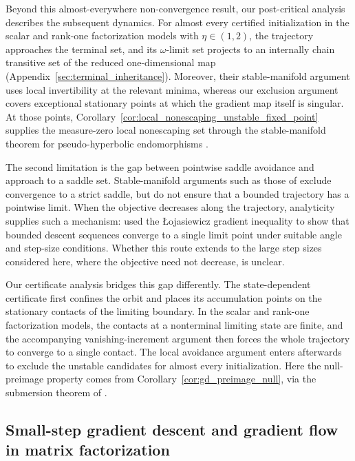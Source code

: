 \documentclass{article}
\begin{document}
Beyond this almost-everywhere non-convergence result, our post-critical
analysis describes the subsequent dynamics. For almost every certified
initialization in the scalar and rank-one factorization models with
$\eta\in(1,2)$, the trajectory approaches the terminal set, and its
$\omega$-limit set projects to an internally chain transitive set of the reduced
one-dimensional map (Appendix~\ref{sec:terminal_inheritance}). Moreover, their
stable-manifold argument uses local invertibility at the relevant minima,
whereas our exclusion argument covers exceptional stationary points at which
the gradient map itself is singular. At those points,
Corollary~\ref{cor:local_nonescaping_unstable_fixed_point} supplies the
measure-zero local nonescaping set through the stable-manifold theorem for
pseudo-hyperbolic endomorphisms \citep[Theorem~5.1]{hirsch1977invariant}.

The second limitation is the gap between pointwise saddle avoidance and
approach to a saddle set. Stable-manifold arguments such as those of
\citet{panageas2017gradient} exclude convergence to a strict saddle, but do not
ensure that a bounded trajectory has a pointwise limit. When the objective
decreases along the trajectory, analyticity supplies such a mechanism:
\citet{absil2005convergence} used the {\L}ojasiewicz gradient inequality to show
that bounded descent sequences converge to a single limit point under suitable
angle and step-size conditions. Whether this route extends to the large step
sizes considered here, where the objective need not decrease, is unclear.

Our certificate analysis bridges this gap differently. The state-dependent
certificate first confines the orbit and places its accumulation points on the
stationary contacts of the limiting boundary. In the scalar and rank-one
factorization models, the contacts at a nonterminal limiting state are finite,
and the accompanying vanishing-increment argument then forces the whole
trajectory to converge to a single contact. The local avoidance argument enters
afterwards to exclude the unstable candidates for almost every initialization.
Here the null-preimage property comes from
Corollary~\ref{cor:gd_preimage_null}, via the submersion theorem of
\cite{ponomarev1987submersions}.

\subsection{Small-step gradient descent and gradient flow in matrix factorization}
\label{subsec:rw_small_step}
\end{document}
